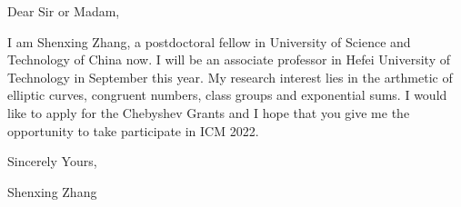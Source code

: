 \documentclass[12pt,a4paper]{article}
\begin{document}
\pagestyle{empty}
\linespread{1.1}
\setlength\parskip{8pt plus 5pt}

\medskip
{}
\large
Dear Sir or Madam,

I am Shenxing Zhang, a postdoctoral fellow in University of Science and Technology of China now.
I will be an associate professor in Hefei University of Technology in September this year.
My research interest lies in the arthmetic of elliptic curves, congruent numbers, class groups and exponential sums.
I would like to apply for the Chebyshev Grants and I hope that you give me the opportunity to take participate in ICM 2022.

Sincerely Yours,

Shenxing Zhang
\end{document}
